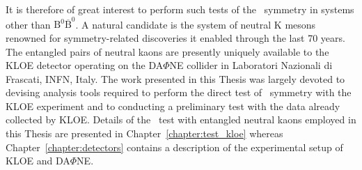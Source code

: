 It is therefore of great interest to perform such tests of the \Ts~symmetry in systems other than $\mathrm{B}^0\overline{\mathrm{B}}^0$. A natural candidate is the system of neutral K mesons renowned for symmetry-related discoveries it enabled through the last 70 years. The entangled pairs of neutral kaons are presently uniquely available to the KLOE detector operating on the DA$\Phi$NE collider in Laboratori Nazionali di Frascati, INFN, Italy. The work presented in this Thesis was largely devoted to devising analysis tools required to perform the direct test of \Ts~symmetry with the KLOE experiment and to conducting a preliminary test with the data already collected by KLOE. Details of the \Ts~test with entangled neutral kaons employed in this Thesis are presented in Chapter~\ref{chapter:test_kloe} whereas Chapter~\ref{chapter:detectors} contains a description of the experimental setup of KLOE and DA$\Phi$NE.


